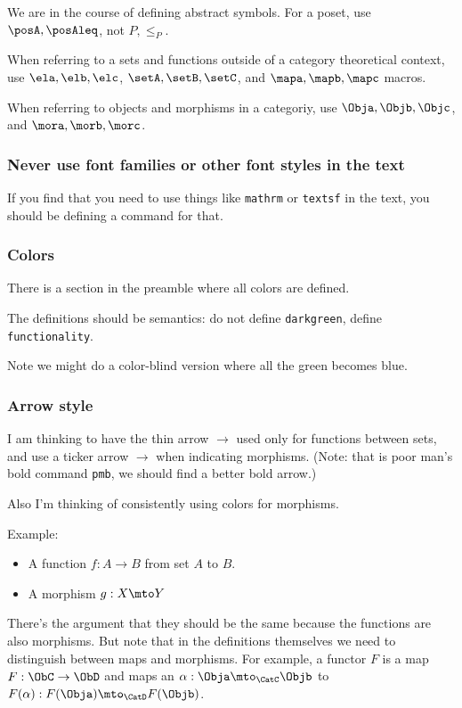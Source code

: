 We are in the course of defining abstract symbols.
For a poset, use $\posA,\posAleq$, not $P,\leq_P$.

When referring to a sets and functions outside of a category theoretical context,   use $\ela,\elb,\elc$, $\setA,\setB,\setC$, and $\mapa,\mapb,\mapc$ macros.

When referring to objects and morphisms in a categoriy,   use $\Obja,\Objb,\Objc$, and $\mora,\morb,\morc$.

\subsubsection*{Never use font families or other font styles in the text}

If you find that you need to use things like \texttt{mathrm} or \texttt{textsf} in the text, you should be defining a command for that.

\subsubsection*{Colors}

There is a section in the preamble where all colors are defined.

The definitions should be semantics: do not define \texttt{darkgreen}, define \texttt{functionality}.

Note we might do a color-blind version where all the green becomes blue.


\subsubsection*{Arrow style}

I am thinking to have the thin arrow $\to$ used only for functions between sets, and use a ticker arrow $\pmb{\to}$ when indicating morphisms.
(Note: that is poor man's bold command \texttt{pmb}, we should find a better bold arrow.)


Also I'm thinking of consistently using colors for morphisms.

Example:
\begin{itemize}
    \item A function $f: A \to B$ from set $A$ to $B$.
    \item A morphism $g: X \mto  Y$
\end{itemize}

There's the argument that they should be the same because the functions are also morphisms.
But note that in the definitions themselves we need to distinguish between maps and morphisms.
For example, a functor $F$ is a map $F: \ObC \to \ObD$ and maps an $\alpha: \Obja \mto_{\CatC} \Objb $ to $F(\alpha): F(\Obja) \mto_{\CatD} F(\Objb) $.


